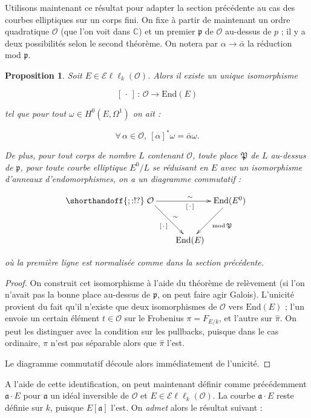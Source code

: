 \documentclass[11pt,a4paper]{article}
\newcommand{\C}{\mathbb{C}}
\renewcommand{\O}{\mathcal{O}}
\newcommand{\vers}{\rightarrow}
\newcommand{\End}{\mathrm{End}}
\newcommand{\Ell}{\mathcal{E}\ell\ell}
\renewcommand{\frak}{\mathfrak}
\newcommand{\de}{\,:\,}
\newtheorem*{prop}{Proposition}
\theoremstyle{definition}
\begin{document}
Utilisons maintenant ce résultat pour adapter la section précédente au cas des courbes elliptiques sur un corps fini. On fixe à partir de maintenant un ordre quadratique $\O$ (que l'on voit dans $\C$) et un premier $\frak p$ de $\O$ au-dessus de $p$ ; il y a deux possibilités selon le second théorème. On notera par $\alpha\vers\bar{\alpha}$ la réduction mod $\frak p$.


\begin{prop}

Soit $E\in \Ell_k(\O)$. Alors il existe un unique isomorphisme

$$[\,\cdot\,] \de \O \vers \End(E)$$

tel que pour tout $\omega \in H^0(E,\Omega^1)$ on ait :

$$\forall \, \alpha \in \O,\ [\alpha]^* \omega = \bar{\alpha}\omega.$$

De plus, pour tout corps de nombre $L$ contenant $\O$, toute place $\frak P$ de $L$ au-dessus de $\frak p$, pour toute courbe elliptique $E^0/L$ se réduisant en $E$ avec un isomorphisme d'anneaux d'endomorphismes, on a un diagramme commutatif :

$$
\shorthandoff{;:!?}
\xymatrix @!=8mm {
\O \ar[rr]^\sim_{[\,\cdot\,]} \ar[rd]^\sim_{[\,\cdot\,]} & & \End(E^0) \ar[ld]^{\mathrm{mod}\,\frak P} \\
 & \End(E) & 
}
$$

où la première ligne est normalisée comme dans la section précédente.

\end{prop}

\begin{proof}

On construit cet isomorphisme à l'aide du théorème de relèvement (si l'on n'avait pas la bonne place au-dessus de $\frak p$, on peut faire agir Galois). L'unicité provient du fait qu'il n'existe que deux isomorphismes de $\O$ vers $\End(E)$ ; l'un envoie un certain élément $t\in \O$ sur le Frobenius $\pi = F_{E/k}$, et l'autre sur $\widehat{\pi}.$ On peut les distinguer avec la condition sur les pullbacks, puisque dans le cas ordinaire, $\pi$ n'est pas séparable alors que $\widehat{\pi}$ l'est.

Le diagramme commutatif découle alors immédiatement de l'unicité.
\end{proof}

A l'aide de cette identification, on peut maintenant définir comme précédemment $\frak a\cdot E$ pour $\frak a$ un idéal inversible de $\O$ et $E\in \Ell_k(\O)$. La courbe $\frak a\cdot E$ reste définie sur $k$, puisque $E[\frak a]$ l'est. On \emph{admet} alors le résultat suivant :
\end{document}
